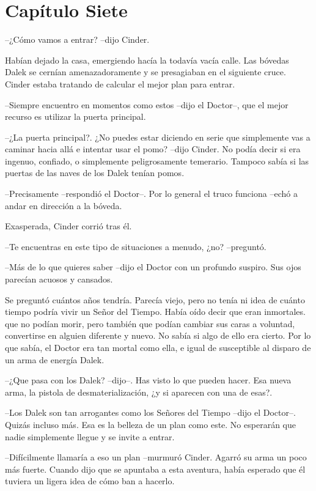 \chapter*{Capítulo Siete}

--¿Cómo vamos a entrar? --dijo Cinder. 

Habían dejado la casa, emergiendo hacía la todavía vacía calle. Las bóvedas Dalek se cernían amenazadoramente y se presagiaban en el siguiente cruce. Cinder estaba tratando de calcular el mejor plan para entrar.

--Siempre encuentro en momentos como estos --dijo el Doctor--, que el mejor recurso es utilizar la puerta principal.

--¿La puerta principal?. ¿No puedes estar diciendo en serie que simplemente vas a caminar hacia allá e intentar usar el pomo? --dijo Cinder. No podía decir si era ingenuo, confiado, o simplemente peligrosamente temerario. Tampoco sabía si las puertas de las naves de los Dalek tenían pomos.

--Precisamente --respondió el Doctor--. Por lo general el truco funciona --echó a andar en dirección a la bóveda.

Exasperada, Cinder corrió tras él. 

--Te encuentras en este tipo de situaciones a menudo, ¿no? --preguntó. 

--Más de lo que quieres saber --dijo el Doctor con un profundo suspiro. Sus ojos parecían acuosos y cansados.

Se preguntó cuántos años tendría. Parecía viejo, pero no tenía ni idea de cuánto tiempo podría vivir un Señor del Tiempo. Había oído decir que eran inmortales. que no podían morir, pero también que podían cambiar sus caras a voluntad, convertirse en alguien diferente y nuevo. No sabía si algo de ello era cierto. Por lo que sabía, el Doctor era tan mortal como ella, e igual de susceptible al disparo de un arma de energía Dalek.

--¿Que pasa con los Dalek? --dijo--. Has visto lo que pueden hacer. Esa nueva arma, la pistola de desmaterialización, ¿y si aparecen con una de esas?. 

--Los Dalek son tan arrogantes como los Señores del Tiempo --dijo el Doctor--. Quizás incluso más. Esa es la belleza de un plan como este. No esperarán que nadie simplemente llegue y se invite a entrar.

--Difícilmente llamaría a eso un plan --murmuró Cinder. Agarró su arma un poco más fuerte. Cuando dijo que se apuntaba a esta aventura, había esperado que él tuviera un ligera idea de cómo ban a hacerlo.

